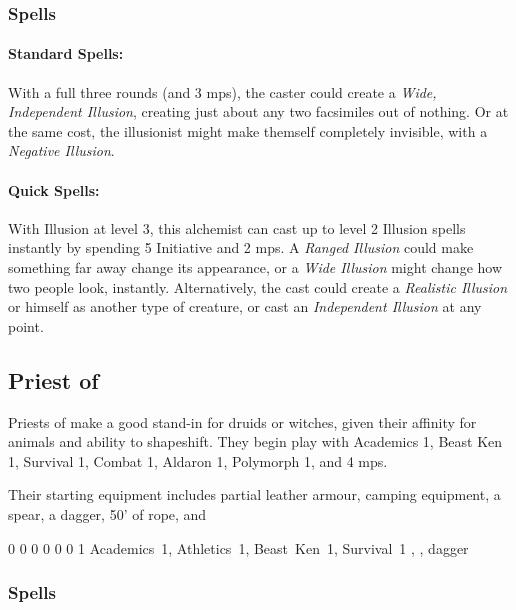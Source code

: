 {\begin{multicols}{2}
\subsubsection{Spells}
\paragraph{Standard Spells:}

With a full three rounds (and 3 \glspl{mp}), the caster could create a \textit{Wide, Independent Illusion}, creating just about any two facsimiles out of nothing.
Or at the same cost, the illusionist might make themself completely invisible, with a \textit{Negative Illusion}.

\paragraph{Quick Spells:}
With Illusion at level 3, this alchemist can cast up to level 2 Illusion spells instantly by spending 5 Initiative and 2 \glspl{mp}.
A \textit{Ranged Illusion} could make something far away change its appearance, or a \textit{Wide Illusion} might change how two people look, instantly.
Alternatively, the cast could create a \textit{Realistic Illusion} or himself as another type of creature, or cast an \textit{Independent Illusion} at any point.

\subsection{Priest of }

Priests of  make a good stand-in for druids or witches, given their affinity for animals and ability to shapeshift.
They begin play with Academics 1, Beast Ken 1, Survival 1, Combat 1, Aldaron 1, Polymorph 1, and 4 \glspl{mp}.

Their starting equipment includes partial leather armour, camping equipment, a spear, a dagger, 50' of rope, and 


{0}%
{0}%
{{0}%
{0}%
{0}}%
{0}%
{1}%
{Academics~1, Athletics~1, Beast~Ken~1, Survival~1
}%
{\spear, \partialleather, dagger}%
{}

\subsubsection{Spells}


\end{multicols}}
